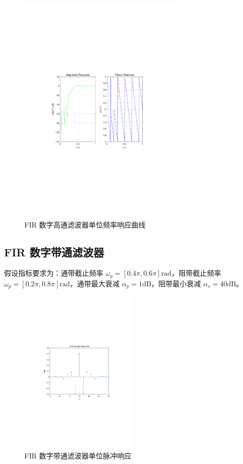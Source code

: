 \documentclass[12pt,AutoFakeBold]{article}
\begin{document}
\begin{figure}[htbp]
	\centering
	\includegraphics[width=0.7\textwidth]{figure/HP2.pdf}
	\caption{FIR 数字高通滤波器单位频率响应曲线} \label{fig:HP2}
\end{figure}

\subsection{FIR 数字带通滤波器}

假设指标要求为：通带截止频率 $\omega_p=[0.4\pi,0.6\pi]\mathrm{rad}$，阻带截止频率 $\omega_p=[0.2\pi,0.8\pi]\mathrm{rad}$，通带最大衰减 $\alpha_p=1\mathrm{dB}$，阻带最小衰减 $\alpha_s=40\mathrm{dB}$。

\begin{figure}[htbp]
	\centering
	\includegraphics[width=0.5\textwidth]{figure/BP1.pdf}
	\caption{FIR 数字带通滤波器单位脉冲响应} \label{fig:BP1}
\end{figure}
\end{document}

